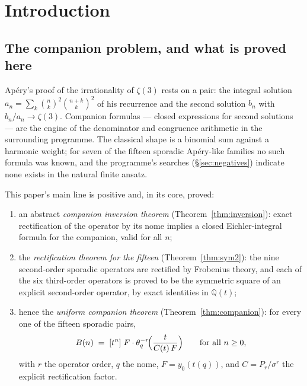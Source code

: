 \documentclass[11pt,reqno]{amsart}
\theoremstyle{plain}
\theoremstyle{definition}
\theoremstyle{remark}
\newcommand{\Q}{\mathbb{Q}}
\newcommand{\bin}[2]{\binom{#1}{#2}}
\newcommand{\thq}{\theta_q}
\begin{document}
\maketitle
\setcounter{tocdepth}{1}
\tableofcontents

\section{Introduction}\label{sec:intro}

\subsection{The companion problem, and what is proved here}
Ap\'ery's proof of the irrationality of $\zeta(3)$ rests on a pair: the
integral solution $a_n=\sum_k\bin nk^2\bin{n+k}k^2$ of his recurrence and
the second solution $b_n$ with $b_n/a_n\to\zeta(3)$. Companion formulas ---
closed expressions for second solutions --- are the engine of the
denominator and congruence arithmetic in the surrounding programme. The
classical shape is a binomial sum against a harmonic weight; for seven of
the fifteen sporadic Ap\'ery-like families no such formula was known, and
the programme's searches (\S\ref{sec:negatives}) indicate none exists in
the natural finite ansatz.

This paper's main line is positive and, in its core, proved:

\begin{enumerate}[leftmargin=2em]
\item an abstract \emph{companion inversion theorem}
(Theorem~\ref{thm:inversion}): exact rectification of the operator by its
nome implies a closed Eichler-integral formula for the companion, valid for
all $n$;
\item the \emph{rectification theorem for the fifteen}
(Theorem~\ref{thm:sym2}): the nine second-order sporadic operators are
rectified by Frobenius theory, and each of the six third-order operators is
proved to be the symmetric square of an explicit second-order operator, by
exact identities in $\Q(t)$;
\item hence the \emph{uniform companion theorem}
(Theorem~\ref{thm:companion}): for every one of the fifteen sporadic pairs,
\[
B(n)\;=\;[t^n]\;F\cdot\thq^{-r}\!\Bigl(\frac{t}{C(t)\,F}\Bigr)
\qquad\text{for all }n\ge0 ,
\]
with $r$ the operator order, $q$ the nome, $F=y_0(t(q))$, and
$C=P_r/\sigma^r$ the explicit rectification factor.
\end{enumerate}
\end{document}
